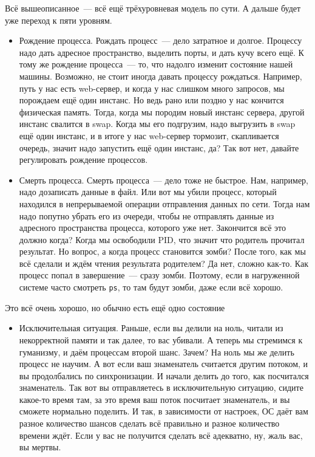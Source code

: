 \documentclass{article}
\begin{document}
    Всё вышеописанное~--- всё ещё трёхуровневая модель по сути. А дальше будет уже переход к пяти уровням.
    \begin{itemize}
        \item Рождение процесса. Рождать процесс~--- дело затратное и долгое. Процессу надо дать адресное пространство, выделить порты, и дать кучу всего ещё. К тому же рождение процесса~--- то, что надолго изменит состояние нашей машины. Возможно, не стоит иногда давать процессу рождаться. Например, путь у нас есть web-сервер, и когда у нас слишком много запросов, мы порождаем ещё один инстанс. Но ведь рано или поздно у нас кончится физическая память. Тогда, когда мы породим новый инстанс сервера, другой инстанс свалится в swap. Когда мы его подгрузим, надо выгрузить в swap ещё один инстанс, и в итоге у нас web-сервер тормозит, скапливается очередь, значит надо запустить ещё один инстанс, да? Так вот нет, давайте регулировать рождение процессов.
        \item Смерть процесса. Смерть процесса~--- дело тоже не быстрое. Нам, например, надо дозаписать данные в файл. Или вот мы убили процесс, который находился в непрерываемой операции отправления данных по сети. Тогда нам надо попутно убрать его из очереди, чтобы не отправлять данные из адресного пространства процесса, которого уже нет. Закончится всё это должно когда? Когда мы освободили PID, что значит что родитель прочитал результат. Но вопрос, а когда процесс становится зомби? После того, как мы всё сделали и ждём чтения результата родителем? Да нет, сложно как-то. Как процесс попал в завершение~--- сразу зомби. Поэтому, если в нагруженной системе часто смотреть \texttt{ps}, то там будут зомби, даже если всё хорошо.
    \end{itemize}
    Это всё очень хорошо, но обычно есть ещё одно состояние
    \begin{itemize}
        \item Исключительная ситуация. Раньше, если вы делили на ноль, читали из некорректной памяти и так далее, то вас убивали. А теперь мы стремимся к гуманизму, и даём процессам второй шанс. Зачем? На ноль мы же делить процесс не научим. А вот если ваш знаменатель считается другим потоком, и вы продолбались по синхронизации. И начали делить до того, как посчитался знаменатель. Так вот вы отправляетесь в исключительную ситуацию, сидите какое-то время там, за это время ваш поток посчитает знаменатель, и вы сможете нормально поделить. И так, в зависимости от настроек, ОС даёт вам разное количество шансов сделать всё правильно и разное количество времени ждёт. Если у вас не получится сделать всё адекватно, ну, жаль вас, вы мертвы.
    \end{itemize}
\end{document}
